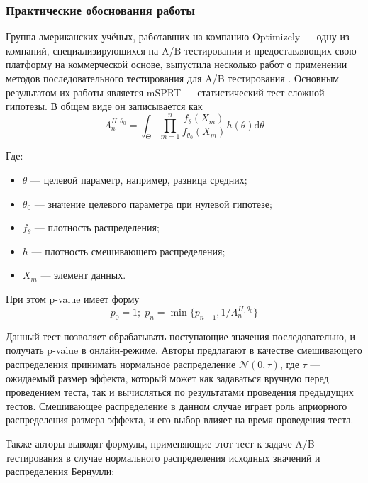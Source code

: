 \documentclass[../document.tex]{subfiles}
\begin{document}
	\subsubsection{Практические обоснования работы}
	\par Группа американских учёных, работавших на компанию Optimizely\cite{optimizely} --- одну из компаний, специализирующихся на A/B тестировании и предоставляющих свою платформу на коммерческой основе, выпустила несколько работ о применении методов последовательного тестирования для A/B тестирования \cite{johari_peeking, johari_always_valid}. Основным результатом их работы является mSPRT --- статистический тест сложной гипотезы. В общем виде он записывается как
	\begin{equation}
		\Lambda_{n}^{H,\theta_0}=\int_{\Theta}\prod\limits_{m=1}^{n}\frac{f_{\theta}(X_m)}{f_{\theta_0}(X_m)}h(\theta)\mathrm{d}\theta
	\end{equation}
	\par Где:
	\begin{itemize}
		\item $\theta$ --- целевой параметр, например, разница средних;
		\item $\theta_0$ --- значение целевого параметра при нулевой гипотезе;
		\item $f_{\theta}$ --- плотность распределения;
		\item $h$ --- плотность смешивающего распределения;
		\item $X_m$ --- элемент данных.
	\end{itemize}
	\par При этом p-value имеет форму
	\begin{equation}
		p_0=1;\;p_n=\min\{p_{n-1},1/\Lambda_{n}^{H,\theta_0}\}
	\end{equation}
	\par Данный тест позволяет обрабатывать поступающие значения последовательно, и получать p-value в онлайн-режиме. Авторы предлагают в качестве смешивающего распределения принимать нормальное распределение $\mathcal{N}(0,\tau)$, где $\tau$ --- ожидаемый размер эффекта, который может как задаваться вручную перед проведением теста, так и вычисляться по результатами проведения предыдущих тестов. Смешивающее распределение в данном случае играет роль априорного распределения размера эффекта, и его выбор влияет на время проведения теста.
	\par Также авторы выводят формулы, применяющие этот тест к задаче A/B тестирования в случае нормального распределения исходных значений и распределения Бернулли:
\end{document}
